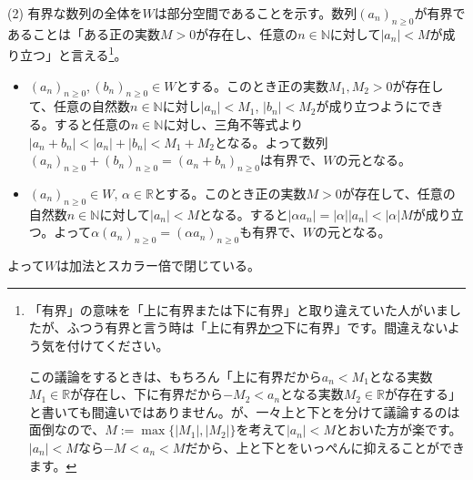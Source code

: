 \noindent (2) 有界な数列の全体を$W$は部分空間であることを示す。数列$(a_n)_{n \geq 0}$が有界であることは「ある正の実数$M>0$が存在し、任意の$n\in\mathbb{N}$に対して$|a_n| < M$が成り立つ」と言える\footnote{「有界」の意味を「上に有界または下に有界」と取り違えていた人がいましたが、ふつう有界と言う時は「上に有界\uline{かつ}下に有界」です。間違えないよう気を付けてください。

この議論をするときは、もちろん「上に有界だから$a_n < M_1$となる実数$M_1\in\mathbb{R}$が存在し、下に有界だから$-M_2 < a_n$となる実数$M_2\in\mathbb{R}$が存在する」と書いても間違いではありません。が、一々上と下とを分けて議論するのは面倒なので、$M := \max\{|M_1|, |M_2|\}$を考えて$|a_n| < M$とおいた方が楽です。$|a_n| < M$なら$-M < a_n <M$だから、上と下とをいっぺんに抑えることができます。}。
\begin{itemize}
\item $(a_n)_{n \geq 0}, (b_n)_{n \geq 0}\in W$とする。このとき正の実数$M_1, M_2 > 0$が存在して、任意の自然数$n \in \mathbb{N}$に対し$|a_n| < M_1$, $|b_n| < M_2$が成り立つようにできる。すると任意の$n\in\mathbb{N}$に対し、三角不等式より$|a_n + b_n| < |a_n| + |b_n| < M_1 + M_2$となる。よって数列$(a_n)_{n \geq 0} + (b_n)_{n \geq 0} = (a_n + b_n)_{n \geq 0}$は有界で、$W$の元となる。
\item $(a_n)_{n \geq 0} \in W$, $\alpha\in\mathbb{R}$とする。このとき正の実数$M > 0$が存在して、任意の自然数$n\in\mathbb{N}$に対して$|a_n| < M$となる。すると$|\alpha a_n| = |\alpha| |a_n| < |\alpha|M$が成り立つ。よって$\alpha(a_n)_{n \geq 0} = (\alpha a_n)_{n \geq 0}$も有界で、$W$の元となる。
\end{itemize}
よって$W$は加法とスカラー倍で閉じている。


